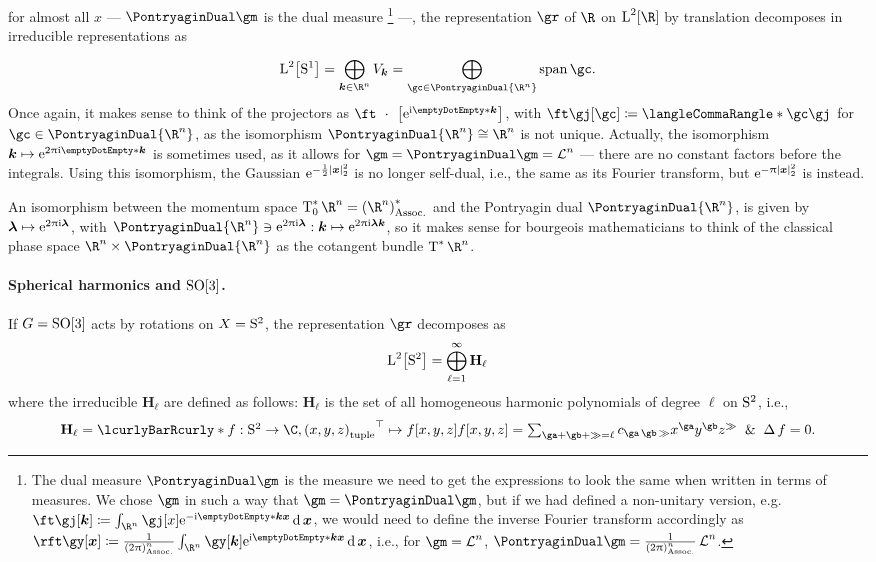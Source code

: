 \documentclass[10pt]{article}
\newcommand{\Rn}{{\R^n}}
\newcommand{\sqftnrm}{\frac{1}{\pa{2\Pi}^n} }
\newenvironment{supplemental}{
\begin{mdframed}%
[hidealllines=true,                 %
  backgroundcolor=red!15!yellow!10  %
]}{\end{mdframed}}
\begin{document}
\begin{supplemental}
for almost all $x$ --- $\PontryaginDual\gm$ is the dual measure
\footnote{The dual measure $\PontryaginDual\gm$ is the measure we need to get the
  expressions to look the same when written in terms of measures. We chose $\gm$ in such
  a way that $\gm = \PontryaginDual\gm$, but if we had defined a non-unitary version, e.g.
  $\ft\gj\of \vk \DefineAs \int \Rn \gj\of x \E^{-\I \scal\vk \vx}\diffd \vx$, we would  
  need to define the inverse Fourier transform accordingly as
  $\rft\gy\of\vx\DefineAs\sqftnrm \int\Rn\gy\of\vk\E^{\I\scal\vk\vx}\diffd\vx$, i.e., for
  $\gm=\LebesgueMeasure n$, $\PontryaginDual \gm = \sqftnrm \LebesgueMeasure n$.}
---, the representation $\gr$ of $\R$ on $\Lspace[2]\of\R$ by translation decomposes in irreducible representations as
\begin{equation*}
  \Lspace[2]\of{\UnitSphere 1}=\DirectSum{\vk\in\Rn}
  V_\vk=\DirectSum{\gc\in\PontryaginDual{\Rn}} \LinearSpan \gc .
\end{equation*}
Once again, it makes sense to think of the projectors as  $\ft\placeholder\of{\E^{\I \scal\vk{}}}$, with $\ft\gj\of\gc \DefineAs \LTwoInner \gc \gj$ for $\gc\in\PontryaginDual\Rn$, as the isomorphism $\PontryaginDual\Rn\Isomorphic\Rn$ is not unique. Actually, the isomorphism $\FunctionBody \vk {\E^{2 \Pi \I \scal{\vk}{} }}$ is sometimes used, as it allows for $\gm = \PontryaginDual\gm = \LebesgueMeasure n$ --- there are no constant factors before the integrals. Using this isomorphism, the Gaussian $\E^{-\frac{1}{2}\norm\vx^2}$ is no longer self-dual, i.e., the same as its Fourier transform, but $\E^{-\Pi\norm\vx^2}$ is instead.

An isomorphism between the momentum space $\CotangentSpace 0 \Rn = \Dual{\pa\Rn}$ and the Pontryagin dual $\PontryaginDual \Rn$, is given by $\FunctionBody \vgl {\E^{2 \Pi \I \vgl }}$, with $\PontryaginDual \Rn\owns\FunctionNamedBody{\E^{2 \Pi \I \vgl}} \vk {\E^{2 \Pi \I \vgl\vk}}$, so it makes sense for bourgeois mathematicians to think of the classical phase space $\Rn\Cartesian\PontryaginDual\Rn$ as the cotangent bundle $\CotangentBundle \Rn$.


\paragraph{Spherical harmonics and $\SpecialOrthogonalGroup\of 3$.} 
\newcommand{\degL}{\ell}
\newcommand{\Harmonic}[1]{\mathbf{H}_{#1}}
If $G=\SpecialOrthogonalGroup\of 3$ acts by rotations on $X=\mathrm{S}^{2}$, the representation $\gr$ decomposes as 
\begin{equation*}
\Lspace[2]\of{\UnitSphere 2} = \DirectSum{\degL=1}[\infty] \Harmonic\degL
\end{equation*}
where the irreducible $\Harmonic\degL$ are defined as follows: $\Harmonic\degL$ is the set of all homogeneous harmonic polynomials of degree $\degL$ on $\mathrm{S}^{2}$, i.e.,
\begin{equation*}
\Harmonic\degL = \setst{\FunctionSpec f {\UnitSphere 2} \C, \FunctionBody {\Transpose{\tuple{x,y,z}}} {f\of{x,y,z}}}{f\of{x,y,z} = \sum {\ga+\gb+\gg = \degL} c_{\ga\,\gb\,\gg} x^{\ga}y^{\gb}z^{\gg} \And \Laplacian f = 0  }.
\end{equation*}


\end{supplemental}
\end{document}
